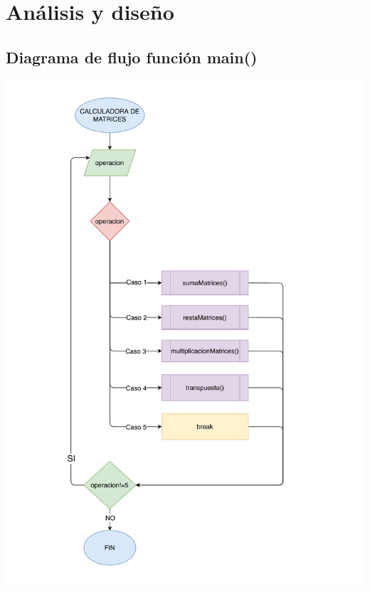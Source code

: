 \documentclass[letter]{revtex4}
\begin{document}
\clearpage
\section{Análisis y diseño}

\subsection{Diagrama de flujo función main()}
\begin{center}
 	\includegraphics[scale=0.8]{Images/Practica2POO.pdf}
 	\label{figura4}
 \end{center}

\clearpage
\end{document}
